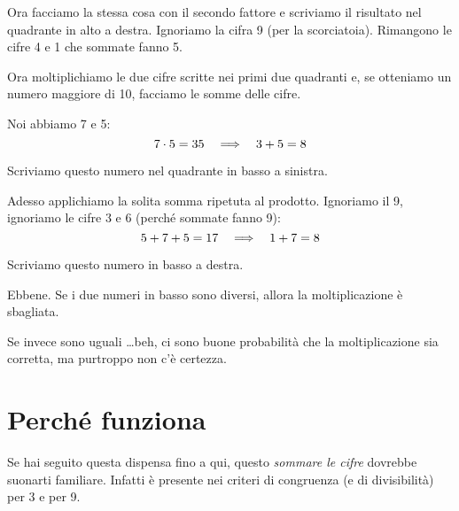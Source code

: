Ora facciamo la stessa cosa con il secondo fattore e scriviamo il risultato nel quadrante in alto a destra.
Ignoriamo la cifra 9 (per la scorciatoia).
Rimangono le cifre 4 e 1 che sommate fanno 5.
\begin{center}
\end{center}

Ora moltiplichiamo le due cifre scritte nei primi due quadranti e, se otteniamo un numero maggiore di 10, facciamo le
somme delle cifre.

Noi abbiamo 7 e 5:
\begin{equation*}
	7 \cdot 5 = 35  \quad\Longrightarrow\quad  3 + 5 = 8
\end{equation*}

Scriviamo questo numero nel quadrante in basso a sinistra.
\begin{center}
\end{center}

Adesso applichiamo la solita somma ripetuta al prodotto.
Ignoriamo il 9, ignoriamo le cifre 3 e 6 (perché sommate fanno 9):
\begin{equation*}
	5 + 7 + 5 = 17  \quad\Longrightarrow\quad  1 + 7 = 8
\end{equation*}

Scriviamo questo numero in basso a destra.
\begin{center}
\end{center}

Ebbene.
Se i due numeri in basso sono diversi, allora la moltiplicazione è sbagliata.

Se invece sono uguali \dots beh, ci sono buone probabilità che la moltiplicazione sia corretta, ma purtroppo non c'è
certezza.

\section{Perché funziona}
\label{sec:prova_del_9_perche}

Se hai seguito questa dispensa fino a qui, questo \emph{sommare le cifre} dovrebbe suonarti familiare.
Infatti è presente nei criteri di congruenza (e di divisibilità) per 3 e per 9.

